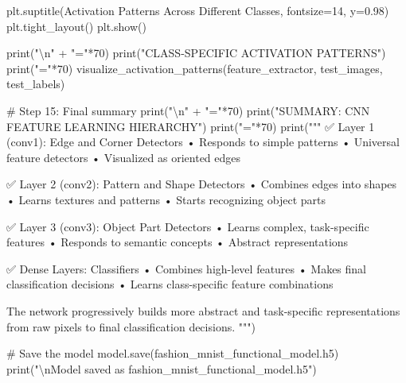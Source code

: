 \documentclass[
  letterpaper,
  DIV=11,
  numbers=noendperiod]{scrreprt}
\newenvironment{Shaded}{\begin{snugshade}}{\end{snugshade}}
\newcommand{\BuiltInTok}[1]{\textcolor[rgb]{0.00,0.23,0.31}{#1}}
\newcommand{\CharTok}[1]{\textcolor[rgb]{0.13,0.47,0.30}{#1}}
\newcommand{\CommentTok}[1]{\textcolor[rgb]{0.37,0.37,0.37}{#1}}
\newcommand{\DecValTok}[1]{\textcolor[rgb]{0.68,0.00,0.00}{#1}}
\newcommand{\FloatTok}[1]{\textcolor[rgb]{0.68,0.00,0.00}{#1}}
\newcommand{\NormalTok}[1]{\textcolor[rgb]{0.00,0.23,0.31}{#1}}
\newcommand{\OperatorTok}[1]{\textcolor[rgb]{0.37,0.37,0.37}{#1}}
\newcommand{\StringTok}[1]{\textcolor[rgb]{0.13,0.47,0.30}{#1}}
\begin{document}
\begin{Shaded}
\begin{Highlighting}[]
\NormalTok{    plt.suptitle(}\StringTok{\textquotesingle{}Activation Patterns Across Different Classes\textquotesingle{}}\NormalTok{, fontsize}\OperatorTok{=}\DecValTok{14}\NormalTok{, y}\OperatorTok{=}\FloatTok{0.98}\NormalTok{)}
\NormalTok{    plt.tight\_layout()}
\NormalTok{    plt.show()}

\BuiltInTok{print}\NormalTok{(}\StringTok{"}\CharTok{\textbackslash{}n}\StringTok{"} \OperatorTok{+} \StringTok{"="}\OperatorTok{*}\DecValTok{70}\NormalTok{)}
\BuiltInTok{print}\NormalTok{(}\StringTok{"CLASS{-}SPECIFIC ACTIVATION PATTERNS"}\NormalTok{)}
\BuiltInTok{print}\NormalTok{(}\StringTok{"="}\OperatorTok{*}\DecValTok{70}\NormalTok{)}
\NormalTok{visualize\_activation\_patterns(feature\_extractor, test\_images, test\_labels)}

\CommentTok{\# Step 15: Final summary}
\BuiltInTok{print}\NormalTok{(}\StringTok{"}\CharTok{\textbackslash{}n}\StringTok{"} \OperatorTok{+} \StringTok{"="}\OperatorTok{*}\DecValTok{70}\NormalTok{)}
\BuiltInTok{print}\NormalTok{(}\StringTok{"SUMMARY: CNN FEATURE LEARNING HIERARCHY"}\NormalTok{)}
\BuiltInTok{print}\NormalTok{(}\StringTok{"="}\OperatorTok{*}\DecValTok{70}\NormalTok{)}
\BuiltInTok{print}\NormalTok{(}\StringTok{"""}
\StringTok{✅ Layer 1 (conv1): Edge and Corner Detectors}
\StringTok{   • Responds to simple patterns}
\StringTok{   • Universal feature detectors}
\StringTok{   • Visualized as oriented edges}

\StringTok{✅ Layer 2 (conv2): Pattern and Shape Detectors}
\StringTok{   • Combines edges into shapes}
\StringTok{   • Learns textures and patterns}
\StringTok{   • Starts recognizing object parts}

\StringTok{✅ Layer 3 (conv3): Object Part Detectors}
\StringTok{   • Learns complex, task{-}specific features}
\StringTok{   • Responds to semantic concepts}
\StringTok{   • Abstract representations}

\StringTok{✅ Dense Layers: Classifiers}
\StringTok{   • Combines high{-}level features}
\StringTok{   • Makes final classification decisions}
\StringTok{   • Learns class{-}specific feature combinations}

\StringTok{The network progressively builds more abstract and }
\StringTok{task{-}specific representations from raw pixels to }
\StringTok{final classification decisions.}
\StringTok{"""}\NormalTok{)}

\CommentTok{\# Save the model}
\NormalTok{model.save(}\StringTok{\textquotesingle{}fashion\_mnist\_functional\_model.h5\textquotesingle{}}\NormalTok{)}
\BuiltInTok{print}\NormalTok{(}\StringTok{"}\CharTok{\textbackslash{}n}\StringTok{Model saved as \textquotesingle{}fashion\_mnist\_functional\_model.h5\textquotesingle{}"}\NormalTok{)}
\end{Highlighting}
\end{Shaded}
\end{document}
